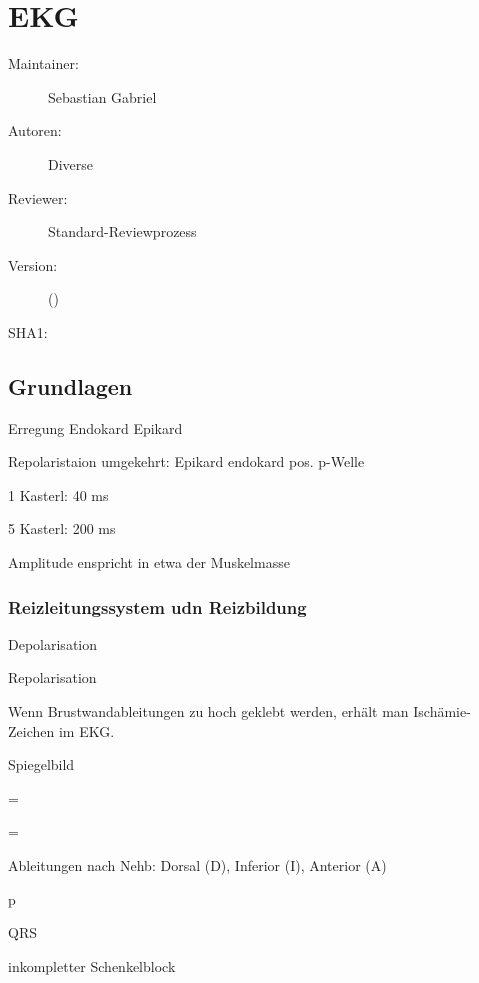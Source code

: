 \def\ChapterCode{EKG}
\chapter
[\CO{[EKG]} EKG]
{EKG}
\label{chp:EKG}



\ChapterIntro
{%
\SectionUnderDevelopment
}
{%
\begin{description}
  \item[Maintainer:] Sebastian Gabriel
  \item[Autoren:] Diverse
  \item[Reviewer:] Standard-Reviewprozess
  \item[Version:] {\DocVersion} ({\DocVersionInfo})
  \item[SHA1:] {\DocGitCommit}
\end{description}

{\TxTeilkapitelAASS}
}

\section{Grundlagen}

Erregung Endokard  Epikard

Repolaristaion umgekehrt: Epikard  endokard  pos. p-Welle

1 Kasterl: 40 ms

5 Kasterl: 200 ms

Amplitude  enspricht in etwa der Muskelmasse

\subsection{Reizleitungssystem udn Reizbildung}


 Depolarisation

 Repolarisation

Wenn Brustwandableitungen zu hoch geklebt werden, erhält man Ischämie-Zeichen im EKG.

 Spiegelbild

 = 

 = 

Ableitungen nach Nehb: Dorsal (D), Inferior (I), Anterior (A)

p 

QRS 

 inkompletter Schenkelblock

